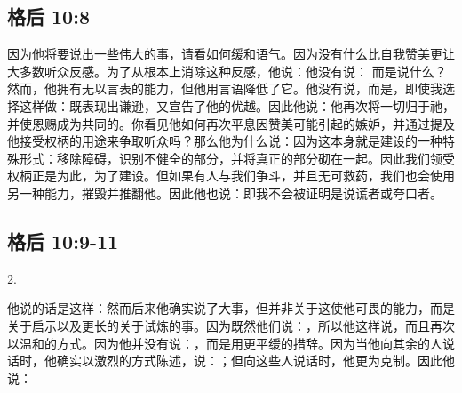 
\subsection{格后 10:8}

\par

因为他将要说出一些伟大的事，请看如何缓和语气。因为没有什么比自我赞美更让大多数听众反感。为了从根本上消除这种反感，他说：他没有说： 而是说什么？然而，他拥有无以言表的能力，但他用言语降低了它。他没有说，而是，即使我选择这样做：既表现出谦逊，又宣告了他的优越。因此他说：他再次将一切归于祂，并使恩赐成为共同的。你看见他如何再次平息因赞美可能引起的嫉妒，并通过提及他接受权柄的用途来争取听众吗？那么他为什么说：因为这本身就是建设的一种特殊形式：移除障碍，识别不健全的部分，并将真正的部分砌在一起。因此我们领受权柄正是为此，为了建设。但如果有人与我们争斗，并且无可救药，我们也会使用另一种能力，摧毁并推翻他。因此他也说：即我不会被证明是说谎者或夸口者。\par


\subsection{格后 10:9-11}

2. \par

他说的话是这样：然而后来他确实说了大事，但并非关于这使他可畏的能力，而是关于启示以及更长的关于试炼的事。因为既然他们说：，所以他这样说，而且再次以温和的方式。因为他并没有说：，而是用更平缓的措辞。因为当他向其余的人说话时，他确实以激烈的方式陈述，说：；但向这些人说话时，他更为克制。因此他说：\par


